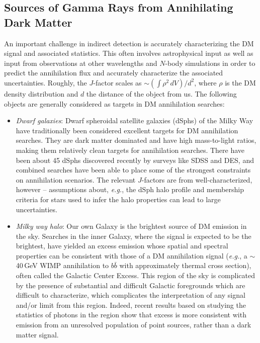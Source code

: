 \subsection{Sources of Gamma Rays from Annihilating Dark Matter}

An important challenge in indirect detection is accurately characterizing the DM signal and associated statistics. This often involves astrophysical input as well as input from observations at other wavelengths and $N$-body simulations in order to predict the annihilation flux and accurately characterize the associated uncertainties. Roughly, the $J$-factor scales as $\sim(\int\rho^2\,dV)/d^2$, where $\rho$ is the DM density distribution and $d$ the distance of the object from us. The following objects are generally considered as targets in DM annihilation searches: 
\begin{itemize}
\item \emph{Dwarf galaxies}: Dwarf spheroidal satellite galaxies (dSphs) of the Milky Way have traditionally been considered excellent targets for DM annihilation searches. They are dark matter dominated and have high mass-to-light ratios, making them relatively clean targets for annihilation searches. There have been about 45 dSphs discovered recently by surveys like SDSS and DES, and combined searches have been able to place some of the strongest constraints on annihilation scenarios. The relevant $J$-factors are from well-characterized, however -- assumptions about, \emph{e.g.}, the dSph halo profile and membership criteria for stars used to infer the halo properties can lead to large uncertainties.
\item \emph{Milky way halo}: Our own Galaxy is the brightest source of DM emission in the sky. Searches in the inner Galaxy, where the signal is expected to be the brightest, have yielded an excess emission whose spatial and spectral properties can be consistent with those of a DM annihilation signal (\emph{e.g.}, a $\sim$40\,GeV WIMP annihilation to $b\bar b$ with approximately thermal cross section), often called the Galactic Center Excess. This region of the sky is complicated by the presence of substantial and difficult Galactic foregrounds which are difficult to characterize, which complicates the interpretation of any signal and/or limit from this region. Indeed, recent results based on studying the statistics of photons in the region show that excess is more consistent with emission from an unresolved population of point sources, rather than a dark matter signal.


\end{itemize}
